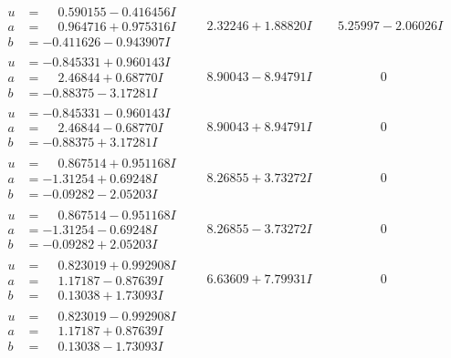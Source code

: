 \documentclass[1p]{elsarticle_modified}
\theoremstyle{definition}
\begin{document}
$$\begin{array}{c|c|c}
\begin{aligned}
u &= \phantom{-}0.590155 - 0.416456 I \\
a &= \phantom{-}0.964716 + 0.975316 I \\
b &= -0.411626 - 0.943907 I\end{aligned}
 & \phantom{-}2.32246 + 1.88820 I & \phantom{-}5.25997 - 2.06026 I \\ \hline\begin{aligned}
u &= -0.845331 + 0.960143 I \\
a &= \phantom{-}2.46844 + 0.68770 I \\
b &= -0.88375 - 3.17281 I\end{aligned}
 & \phantom{-}8.90043 - 8.94791 I & \phantom{-0.000000 } 0 \\ \hline\begin{aligned}
u &= -0.845331 - 0.960143 I \\
a &= \phantom{-}2.46844 - 0.68770 I \\
b &= -0.88375 + 3.17281 I\end{aligned}
 & \phantom{-}8.90043 + 8.94791 I & \phantom{-0.000000 } 0 \\ \hline\begin{aligned}
u &= \phantom{-}0.867514 + 0.951168 I \\
a &= -1.31254 + 0.69248 I \\
b &= -0.09282 - 2.05203 I\end{aligned}
 & \phantom{-}8.26855 + 3.73272 I & \phantom{-0.000000 } 0 \\ \hline\begin{aligned}
u &= \phantom{-}0.867514 - 0.951168 I \\
a &= -1.31254 - 0.69248 I \\
b &= -0.09282 + 2.05203 I\end{aligned}
 & \phantom{-}8.26855 - 3.73272 I & \phantom{-0.000000 } 0 \\ \hline\begin{aligned}
u &= \phantom{-}0.823019 + 0.992908 I \\
a &= \phantom{-}1.17187 - 0.87639 I \\
b &= \phantom{-}0.13038 + 1.73093 I\end{aligned}
 & \phantom{-}6.63609 + 7.79931 I & \phantom{-0.000000 } 0 \\ \hline\begin{aligned}
u &= \phantom{-}0.823019 - 0.992908 I \\
a &= \phantom{-}1.17187 + 0.87639 I \\
b &= \phantom{-}0.13038 - 1.73093 I\end{aligned}

\end{array}$$
\end{document}
